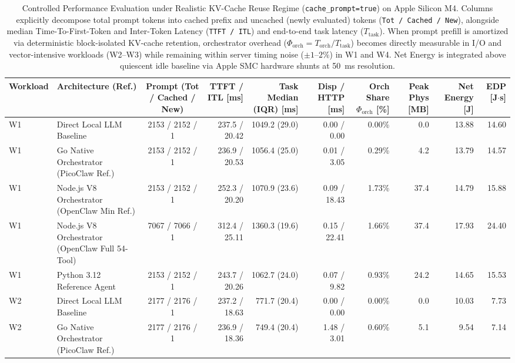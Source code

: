 \begin{table}[t]
\centering
\caption{Controlled Performance Evaluation under Realistic KV-Cache Reuse Regime (\texttt{cache\_prompt=true}) on Apple Silicon M4. Columns explicitly decompose total prompt tokens into cached prefix and uncached (newly evaluated) tokens (\texttt{Tot / Cached / New}), alongside median Time-To-First-Token and Inter-Token Latency (\texttt{TTFT / ITL}) and end-to-end task latency ($T_{\text{task}}$). When prompt prefill is amortized via deterministic block-isolated KV-cache retention, orchestrator overhead ($\Phi_{\text{orch}} = T_{\text{orch}} / T_{\text{task}}$) becomes directly measurable in I/O and vector-intensive workloads (W2--W3) while remaining within server timing noise ($\pm 1\text{--}2\%$) in W1 and W4. Net Energy is integrated above quiescent idle baseline via Apple SMC hardware shunts at 50~ms resolution.}
\label{tab:evaluation_warm_cache_m4}
\scriptsize
\setlength{\tabcolsep}{3.5pt}
\begin{tabular}{l l c r r r r r r r}
\hline
\textbf{Workload} & \textbf{Architecture (Ref.)} & \textbf{Prompt (Tot / Cached / New)} & \textbf{TTFT / ITL [ms]} & \textbf{Task Median (IQR) [ms]} & \textbf{Disp / HTTP [ms]} & \textbf{Orch Share $\Phi_{\text{orch}}$ [\%]} & \textbf{Peak Phys [MB]} & \textbf{Net Energy [J]} & \textbf{EDP [J$\cdot$s]} \\
\hline
W1 & Direct Local LLM Baseline & 2153 / 2152 / 1 & 237.5 / 20.42 & 1049.2 (29.0) & 0.00 / 0.00 & 0.00\% & 0.0 & 13.88 & 14.60 \\
W1 & Go Native Orchestrator (PicoClaw Ref.) & 2153 / 2152 / 1 & 236.9 / 20.53 & 1056.4 (25.0) & 0.01 / 3.05 & 0.29\% & 4.2 & 13.79 & 14.57 \\
W1 & Node.js V8 Orchestrator (OpenClaw Min Ref.) & 2153 / 2152 / 1 & 252.3 / 20.20 & 1070.9 (23.6) & 0.09 / 18.43 & 1.73\% & 37.4 & 14.79 & 15.88 \\
W1 & Node.js V8 Orchestrator (OpenClaw Full 54-Tool) & 7067 / 7066 / 1 & 312.4 / 25.11 & 1360.3 (19.6) & 0.15 / 22.41 & 1.66\% & 37.4 & 17.93 & 24.40 \\
W1 & Python 3.12 Reference Agent & 2153 / 2152 / 1 & 243.7 / 20.26 & 1062.7 (24.0) & 0.07 / 9.82 & 0.93\% & 24.2 & 14.65 & 15.53 \\
\hline
W2 & Direct Local LLM Baseline & 2177 / 2176 / 1 & 237.2 / 18.63 & 771.7 (20.4) & 0.00 / 0.00 & 0.00\% & 0.0 & 10.03 & 7.73 \\
W2 & Go Native Orchestrator (PicoClaw Ref.) & 2177 / 2176 / 1 & 236.9 / 18.36 & 749.4 (20.4) & 1.48 / 3.01 & 0.60\% & 5.1 & 9.54 & 7.14 \\

\end{tabular}
\end{table}
